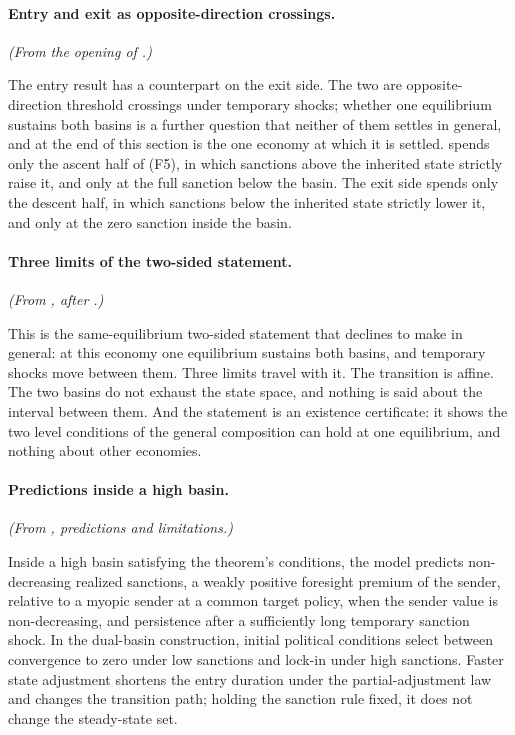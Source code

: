 \paragraph{Entry and exit as opposite-direction crossings.} \emph{(From the opening of .)}

The entry result has a counterpart on the exit side. The two are
opposite-direction threshold crossings under temporary shocks; whether one
equilibrium sustains both basins is a further question that neither of
them settles in general, and  at the
end of this section is the one economy at which it is settled.
 spends only the ascent half of \textup{(F5)}, in which sanctions
above the inherited state strictly raise it, and only at the full sanction
below the basin. The exit side spends only the descent half, in which sanctions
below the inherited state strictly lower it, and only at the zero sanction
inside the basin.

\paragraph{Three limits of the two-sided statement.} \emph{(From , after .)}

This is the same-equilibrium two-sided statement that
 declines to make in general: at this economy one
equilibrium sustains both basins, and temporary shocks move between them.
Three limits travel with it. The transition is affine. The two basins do
not exhaust the state space, and nothing is said about the interval between
them. And the statement is an existence certificate: it shows the two level
conditions of the general composition can hold at one equilibrium, and
nothing about other economies.

\paragraph{Predictions inside a high basin.} \emph{(From , predictions and limitations.)}

Inside a high basin satisfying the theorem's conditions, the model predicts non-decreasing
realized sanctions, a weakly positive foresight premium of the sender, relative to a myopic
sender at a common target policy, when the sender value is non-decreasing,
and persistence after a sufficiently long temporary sanction
shock. In the dual-basin construction, initial political conditions
select between convergence to zero under low sanctions and lock-in under high sanctions. Faster
state adjustment shortens the entry duration under the partial-adjustment law and changes the
transition path; holding the sanction rule fixed, it does not
change the steady-state set.

